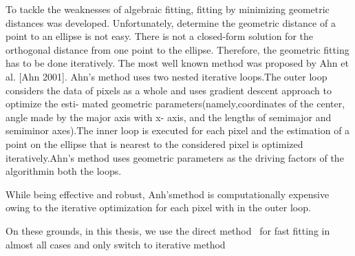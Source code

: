 \documentclass[a4paper]{report}
\begin{document}
To tackle the weaknesses of algebraic fitting, fitting by minimizing geometric distances was developed. Unfortunately, determine the geometric distance of a point to an ellipse is not easy. There is not a closed-form solution for the orthogonal distance from one point to the ellipse. Therefore, the geometric fitting has to be done iteratively. 
The most well known method was proposed by Ahn et al. [Ahn 2001].
Ahn’s method uses two nested
iterative loops.The outer loop considers the data of pixels as a
whole and uses gradient descent approach to optimize the esti-
mated geometric parameters(namely,coordinates of the center,
angle made by the major axis with x- axis, and the lengths of
semimajor and semiminor axes).The inner loop is executed for each
pixel and the estimation of a point on the ellipse that is nearest to
the considered pixel is optimized iteratively.Ahn’s method uses
geometric parameters as the driving factors of the algorithmin both
the loops.

While being effective and
robust, Anh’smethod is computationally expensive owing to the iterative optimization for each pixel with in the outer loop.
%


On these grounds, in this thesis, we use the direct method~\cite{fitzgibbon1999direct}  for fast fitting in almost all cases and only switch to iterative method  


 

\end{document}

